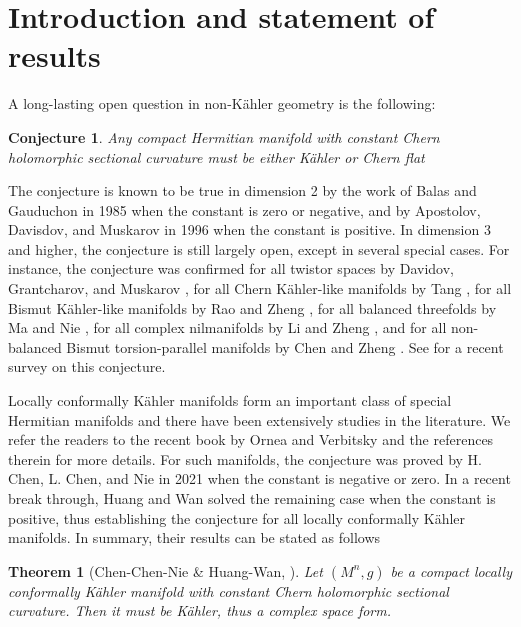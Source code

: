 \documentclass{amsart}
\newtheorem{theorem}{Theorem}%
\newtheorem{conjecture}{Conjecture}
\numberwithin{equation}{section}
\begin{document}
\tableofcontents

\section{Introduction and statement of results}\label{intro}


A long-lasting open question in non-K\"ahler geometry is the following:


\begin{conjecture} \label{conj1}
Any compact Hermitian manifold with constant Chern holomorphic sectional curvature must be either K\"ahler or Chern flat
\end{conjecture}

The conjecture is known to be true in dimension 2 by the work of Balas and Gauduchon \cite{Balas, BG} in 1985 when the constant is zero or negative, and by Apostolov, Davisdov, and Muskarov \cite{ADM} in 1996 when the constant is positive. In dimension 3 and higher, the conjecture is still largely open, except in several special cases. For instance, the conjecture was confirmed for all twistor spaces by Davidov, Grantcharov, and Muskarov \cite{DGM}, for all Chern K\"ahler-like manifolds by Tang \cite{Tang}, for all Bismut K\"ahler-like manifolds by Rao and Zheng \cite{RaoZ}, for all balanced threefolds by Ma and Nie \cite{MaN},  for all complex nilmanifolds by Li and Zheng \cite{LiZ},  and for all non-balanced Bismut torsion-parallel manifolds by Chen and Zheng \cite{ChenZ26}. See \cite{Zheng} for a recent survey on this conjecture.

Locally conformally K\"ahler  manifolds form an important class of  special Hermitian manifolds and there have been extensively studies in the literature. We refer the readers to the recent book by Ornea and Verbitsky \cite{OV} and the references therein for more details. For such  manifolds, the conjecture was proved by H. Chen, L. Chen, and Nie \cite{CCN} in 2021 when the constant is negative or zero. In a recent break through, Huang and Wan \cite{HW} solved the remaining case when the constant is positive, thus establishing the conjecture for all locally conformally K\"ahler manifolds. In summary, their results can be stated as follows

\begin{theorem}[Chen-Chen-Nie \& Huang-Wan, \cite{CCN,HW}] \label{thm0}
Let $(M^n,g)$ be a compact locally conformally K\"ahler manifold with constant Chern holomorphic sectional curvature. Then it must be K\"ahler, thus a complex space form.
\end{theorem}
\end{document}
